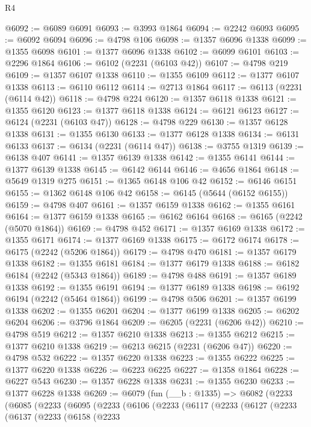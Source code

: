 \begin{lexlean}{R4}
\begin{coremodule}
@6092 := @6089 @6091
@6093 := @3993 @1864
@6094 := @2242 @6093
@6095 := @6092 @6094
@6096 := @4798 @106
@6098 := @1357 @6096 @1338
@6099 := @1355 @6098
@6101 := @1377 @6096 @1338
@6102 := @6099 @6101
@6103 := @2296 @1864
@6106 := @6102 (@2231 (@6103 @42))
@6107 := @4798 @219
@6109 := @1357 @6107 @1338
@6110 := @1355 @6109
@6112 := @1377 @6107 @1338
@6113 := @6110 @6112
@6114 := @2713 @1864
@6117 := @6113 (@2231 (@6114 @42))
@6118 := @4798 @224
@6120 := @1357 @6118 @1338
@6121 := @1355 @6120
@6123 := @1377 @6118 @1338
@6124 := @6121 @6123
@6127 := @6124 (@2231 (@6103 @47))
@6128 := @4798 @229
@6130 := @1357 @6128 @1338
@6131 := @1355 @6130
@6133 := @1377 @6128 @1338
@6134 := @6131 @6133
@6137 := @6134 (@2231 (@6114 @47))
@6138 := @3755 @1319
@6139 := @6138 @407
@6141 := @1357 @6139 @1338
@6142 := @1355 @6141
@6144 := @1377 @6139 @1338
@6145 := @6142 @6144
@6146 := @4656 @1864
@6148 := @5649 @1319 @275
@6151 := @1365 @6148 @106 @42
@6152 := @6146 @6151
@6155 := @1362 @6148 @106 @42
@6158 := @6145 (@5644 (@6152 @6155))
@6159 := @4798 @407
@6161 := @1357 @6159 @1338
@6162 := @1355 @6161
@6164 := @1377 @6159 @1338
@6165 := @6162 @6164
@6168 := @6165 (@2242 (@5070 @1864))
@6169 := @4798 @452
@6171 := @1357 @6169 @1338
@6172 := @1355 @6171
@6174 := @1377 @6169 @1338
@6175 := @6172 @6174
@6178 := @6175 (@2242 (@5206 @1864))
@6179 := @4798 @470
@6181 := @1357 @6179 @1338
@6182 := @1355 @6181
@6184 := @1377 @6179 @1338
@6188 := @6182 @6184 (@2242 (@5343 @1864))
@6189 := @4798 @488
@6191 := @1357 @6189 @1338
@6192 := @1355 @6191
@6194 := @1377 @6189 @1338
@6198 := @6192 @6194 (@2242 (@5464 @1864))
@6199 := @4798 @506
@6201 := @1357 @6199 @1338
@6202 := @1355 @6201
@6204 := @1377 @6199 @1338
@6205 := @6202 @6204
@6206 := @3796 @1864
@6209 := @6205 (@2231 (@6206 @42))
@6210 := @4798 @519
@6212 := @1357 @6210 @1338
@6213 := @1355 @6212
@6215 := @1377 @6210 @1338
@6219 := @6213 @6215 (@2231 (@6206 @47))
@6220 := @4798 @532
@6222 := @1357 @6220 @1338
@6223 := @1355 @6222
@6225 := @1377 @6220 @1338
@6226 := @6223 @6225
@6227 := @1358 @1864
@6228 := @6227 @543
@6230 := @1357 @6228 @1338
@6231 := @1355 @6230
@6233 := @1377 @6228 @1338
@6269 := @6079
    (fun (__b : @1335) =>
    @6082
      (@2233
        (@6085
          (@2233
            (@6095
              (@2233
                (@6106
                  (@2233
                    (@6117
                      (@2233
                        (@6127
                          (@2233
                            (@6137
                              (@2233
                                (@6158
                                  (@2233

\end{coremodule}
\end{lexlean}
